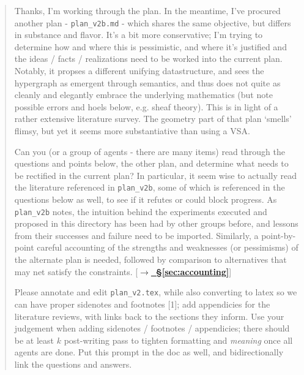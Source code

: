 \documentclass[12pt]{article}
\begin{document}
\begin{quote}\small
Thanks, I'm working through the plan. In the meantime, I've procured another plan - \texttt{plan\_v2b.md} - which shares the same objective, but differs in substance and flavor. It's a bit more conservative; I'm trying to determine how and where this is pessimistic, and where it's justified and the ideas / facts / realizations need to be worked into the current plan. Notably, it propses a different unifying datastructure, and sees the hypergraph as emergent through semantics, and thus does not quite as cleanly and elegantly embrace the underlying mathematics (but note possible errors and hoels below, e.g. sheaf theory). This is in light of a rather extensive literature survey. The geometry part of that plan `smells' flimsy, but yet it seems more substantiative than using a VSA.

Can you (or a group of agents - there are many items) read through the questions and points below, the other plan, and determine what needs to be rectified in the current plan? In particular, it seem wise to actually read the literature referenced in \texttt{plan\_v2b}, some of which is referenced in the questions below as well, to see if it refutes or could block progress. As \texttt{plan\_v2b} notes, the intuition behind the experiments executed and proposed in this directory has been had by other groups before, and lessons from their successes and failure need to be imported. Similarly, a point-by-point careful accounting of the strengths and weaknesses (or pessimisms) of the alternate plan is needed, followed by comparison to alternatives that may net satisfy the constraints. [\hyperref[sec:accounting]{\textcolor{qpurple}{\textbf{\(\rightarrow\)~\S\ref{sec:accounting}}}}]

Please annotate and edit \texttt{plan\_v2.tex}, while also converting to latex so we can have proper sidenotes and footnotes [1]; add appendicies for the literature reviews, with links back to the sections they inform. Use your judgement when adding sidenotes / footnotes / appendicies; there should be at least $k$ post-writing pass to tighten formatting and \emph{meaning} once all agents are done. Put this prompt in the doc as well, and bidirectionally link the questions and answers.


\end{quote}
\end{document}
